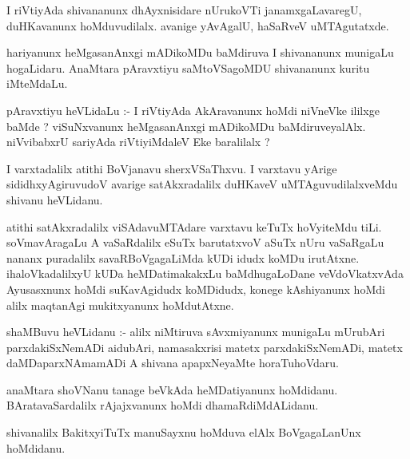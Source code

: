 \documentclass{article}
\begin{document}
\begin{mn}
I  riVtiyAda  shivananunx  dhAyxnisidare  nUrukoVTi  janamxgaLavaregU,  duHKavanunx  hoMduvudilalx.  
avanige  yAvAgalU,  haSaRveV  uMTAgutatxde.
\end{mn}

\begin{mn}
hariyanunx  heMgasanAnxgi  mADikoMDu  baMdiruva  I  shivananunx  munigaLu  hogaLidaru.  AnaMtara  
pAravxtiyu  saMtoVSagoMDU  shivananunx  kuritu  iMteMdaLu.
\end{mn}

\begin{mn}
pAravxtiyu  heVLidaLu :- I riVtiyAda  AkAravanunx  hoMdi  niVneVke  ililxge  baMde ?  viSuNxvanunx  
heMgasanAnxgi  mADikoMDu  baMdiruveyalAlx.  niVvibabxrU  sariyAda  riVtiyiMdaleV  Eke  baralilalx ?
\end{mn}

\begin{mn}
I  varxtadalilx  atithi BoVjanavu  sherxVSaThxvu.  I  varxtavu  yArige  sididhxyAgiruvudoV  avarige  
satAkxradalilx  duHKaveV  uMTAguvudilalxveMdu  shivanu  heVLidanu.
\end{mn}

\begin{mn}
atithi satAkxradalilx  viSAdavuMTAdare  varxtavu  keTuTx  hoVyiteMdu  tiLi.  soVmavAragaLu  A  vaSaRdalilx  
eSuTx  barutatxvoV  aSuTx  nUru  vaSaRgaLu  nananx  puradalilx  savaRBoVgagaLiMda  kUDi  idudx koMDu  irutAtxne.  
ihaloVkadalilxyU  kUDa  heMDatimakakxLu  baMdhugaLoDane  veVdoVkatxvAda  Ayusasxnunx  hoMdi  suKavAgidudx koMDidudx,  
konege  kAshiyanunx  hoMdi  alilx  maqtanAgi  mukitxyanunx  hoMdutAtxne.
\end{mn}

\begin{mn}
shaMBuvu  heVLidanu :- alilx  niMtiruva  sAvxmiyanunx  munigaLu  mUrubAri  parxdakiSxNemADi  aidubAri,  
namasakxrisi  matetx  parxdakiSxNemADi,  matetx  daMDaparxNAmamADi  A  shivana  apapxNeyaMte  horaTuhoVdaru.
\end{mn}

\begin{mn}
anaMtara  shoVNanu  tanage  beVkAda  heMDatiyanunx  hoMdidanu.  BAratavaSardalilx  rAjajxvanunx  hoMdi  dhamaRdiMdALidanu.
\end{mn}

\begin{mn}
shivanalilx  BakitxyiTuTx  manuSayxnu  hoMduva  elAlx  BoVgagaLanUnx  hoMdidanu.
\end{mn}
\end{document}
